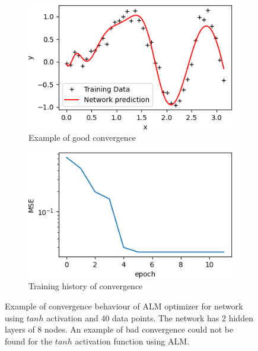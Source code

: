 \begin{figure}[p]
     \centering
     \begin{subfigure}[b]{0.49\textwidth}
         \centering
         \includegraphics[width=\textwidth]{almgood}
         \caption{Example of good convergence}
         \label{almgood}
     \end{subfigure}
     \begin{subfigure}[b]{0.49\textwidth}
         \centering
         \includegraphics[width=\textwidth]{almgoodconv}
         \caption{Training history of convergence}
         \label{almgoodconv}
     \end{subfigure}
     \caption{Example of convergence behaviour of ALM optimizer for network using $tanh$ activation and 40 data points. The network has 2 hidden layers of 8 nodes. An example of bad convergence could not be found for the $tanh$ activation function using ALM.}
     \label{almconv}
\end{figure}

